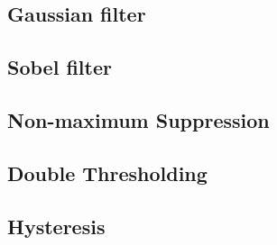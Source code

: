 \subsection{Gaussian filter}
\label{subsec:gauss}


\subsection{Sobel filter}
\label{subsec:sobel}


\subsection{Non-maximum Suppression}
\label{subsec:non-maximum-suppression}

\subsection{Double Thresholding}
\label{subsec:double-thresholding}

\subsection{Hysteresis}
\label{subsec:hysteresis}
